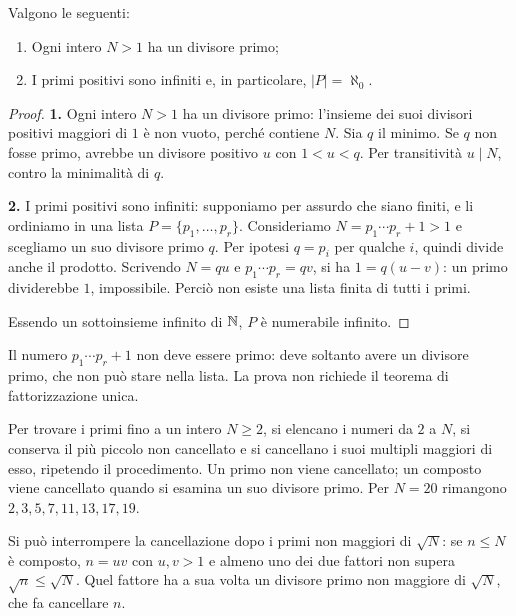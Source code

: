 \begin{teorema}
Valgono le seguenti:
\begin{enumerate}
    \item Ogni intero $N>1$ ha un divisore primo;
    \item I primi positivi sono infiniti e, in particolare, $|P|=\aleph_0$.
\end{enumerate}
\end{teorema}
\begin{proof}
\textbf{1.} Ogni intero $N>1$ ha un divisore primo: l'insieme dei suoi divisori positivi maggiori di $1$ è non vuoto, perché contiene $N$. Sia $q$ il minimo. Se $q$ non fosse primo, avrebbe un divisore positivo $u$ con $1<u<q$. Per transitività $u\mid N$, contro la minimalità di $q$.

\textbf{2.} I primi positivi sono infiniti: supponiamo per assurdo che siano finiti, e li ordiniamo in una lista $P=\{p_1,\ldots,p_r\}$. Consideriamo $N=p_1\cdots p_r+1>1$ e scegliamo un suo divisore primo $q$. Per ipotesi $q=p_i$ per qualche $i$, quindi divide anche il prodotto. Scrivendo $N=qu$ e $p_1\cdots p_r=qv$, si ha $1=q(u-v)$: un primo dividerebbe $1$, impossibile. Perciò non esiste una lista finita di tutti i primi.

Essendo un sottoinsieme infinito di $\mathbb{N}$, $P$ è numerabile infinito.
\end{proof}

\begin{osservazione}
Il numero $p_1\cdots p_r+1$ non deve essere primo: deve soltanto avere un divisore primo, che non può stare nella lista. La prova non richiede il teorema di fattorizzazione unica.
\end{osservazione}

\begin{esempio}
Per trovare i primi fino a un intero $N\ge2$, si elencano i numeri da $2$ a $N$, si conserva il più piccolo non cancellato e si cancellano i suoi multipli maggiori di esso, ripetendo il procedimento. Un primo non viene cancellato; un composto viene cancellato quando si esamina un suo divisore primo. Per $N=20$ rimangono $2,3,5,7,11,13,17,19$.

Si può interrompere la cancellazione dopo i primi non maggiori di $\sqrt N$: se $n\le N$ è composto, $n=uv$ con $u,v>1$ e almeno uno dei due fattori non supera $\sqrt n\le\sqrt N$. Quel fattore ha a sua volta un divisore primo non maggiore di $\sqrt N$, che fa cancellare $n$.
\end{esempio}

